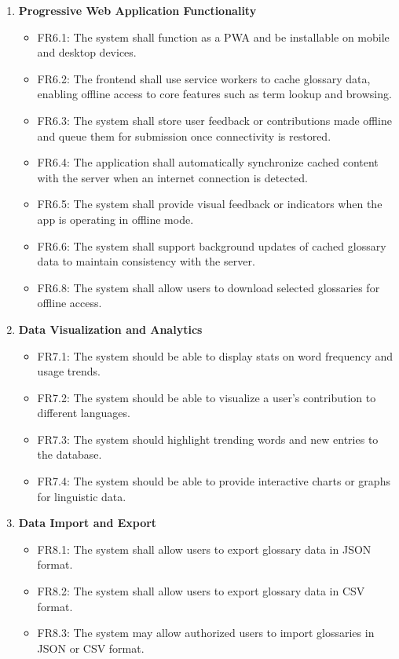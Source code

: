 \documentclass[12pt]{article}
\begin{document}
\begin{enumerate}[label=FR\arabic*:, leftmargin=2.5em]
    \item \textbf{Progressive Web Application Functionality}
    \begin{itemize}
        \item FR6.1: The system shall function as a PWA and be installable on mobile and desktop devices.
        \item FR6.2: The frontend shall use service workers to cache glossary data, enabling offline access to core features such as term lookup and browsing.
        \item FR6.3: The system shall store user feedback or contributions made offline and queue them for submission once connectivity is restored.
        \item FR6.4: The application shall automatically synchronize cached content with the server when an internet connection is detected.
        \item FR6.5: The system shall provide visual feedback or indicators when the app is operating in offline mode.
        \item FR6.6: The system shall support background updates of cached glossary data to maintain consistency with the server.
        \item FR6.8: The system shall allow users to download selected glossaries for offline access.
    \end{itemize}

    \item \textbf{Data Visualization and Analytics}
    \begin{itemize}
        \item FR7.1: The system should be able to display stats on word frequency and usage trends.
        \item FR7.2: The system should be able to visualize a user's contribution to different languages.
        \item FR7.3: The system should highlight trending words and new entries to the database.
        \item FR7.4: The system should be able to provide interactive charts or graphs for linguistic data.
    \end{itemize}

    \item \textbf{Data Import and Export}
    \begin{itemize}
        \item FR8.1: The system shall allow users to export glossary data in JSON format.
        \item FR8.2: The system shall allow users to export glossary data in CSV format.
        \item FR8.3: The system may allow authorized users to import glossaries in JSON or CSV format.
    \end{itemize}


\end{enumerate}
\end{document}
